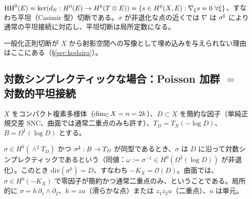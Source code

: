 \begin{obs}[一般化正則切断は平坦切断]\tP\label{obs:casimir}
$\mathrm{HH}^0(E)=\ker(d_E:H^0(E)\to H^0(T\otimes E))=\{s\in H^0(X,E):\nabla_\xi s=0\ \forall\xi\}$、すなわち平坦（Casimir 型）切断である。$\sigma$ が非退化な点の近くでは $\nabla$ は $\sigma^\sharp$ により通常の平坦接続に対応し、平坦切断は局所定数になる。
\end{obs}
一般化正則切断が $X$ から射影空間への写像として埋め込みを与えられない理由はここにある（\S\ref{sec:kodaira}）。

\subsection{対数シンプレクティックな場合：Poisson 加群 $=$ 対数的平坦接続}\label{subsec:logsymp}
$X$ をコンパクト複素多様体（$\dim_\mathbb C X=n=2k$）、$D\subset X$ を簡約な因子（単純正規交差 SNC、曲面では通常二重点のみも許す）、$T_D=T_X(-\log D)$、$B=\Omega^1(\log D)$ とする。
\begin{defn}[対数シンプレクティック]\tC\label{defn:logsymp}
$\sigma\in H^0(\wedge^2T_D)$ かつ $\sigma^\sharp:B\to T_D$ が同型であるとき、$\sigma$ は $D$ に沿って対数シンプレクティックであるという（同値：$\omega:=\sigma^{-1}\in H^0(\Omega^2(\log D))$ が非退化）。このとき $\mathrm{div}(\sigma^k)=D$、すなわち $-K_X=\mathcal O(D)$。曲面では、$\sigma\in H^0(-K_X)$ で零因子が簡約かつ通常二重点のみ、ということである。局所的に $\sigma=h\,\partial_1\wedge\partial_2$、$h=zu$（滑らかな点）または $z_1z_2u$（二重点）、$u$ は単元。
\end{defn}


